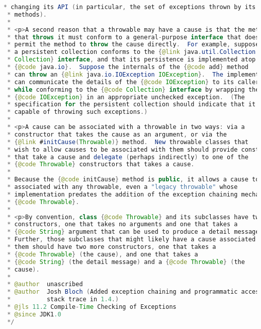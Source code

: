 \begin{lstlisting}[language=java]
 * changing its API (in particular, the set of exceptions thrown by its
 * methods).
 *
 * <p>A second reason that a throwable may have a cause is that the method
 * that throws it must conform to a general-purpose interface that does not
 * permit the method to throw the cause directly.  For example, suppose
 * a persistent collection conforms to the {@link java.util.Collection
 * Collection} interface, and that its persistence is implemented atop
 * {@code java.io}.  Suppose the internals of the {@code add} method
 * can throw an {@link java.io.IOException IOException}.  The implementation
 * can communicate the details of the {@code IOException} to its caller
 * while conforming to the {@code Collection} interface by wrapping the
 * {@code IOException} in an appropriate unchecked exception.  (The
 * specification for the persistent collection should indicate that it is
 * capable of throwing such exceptions.)
 *
 * <p>A cause can be associated with a throwable in two ways: via a
 * constructor that takes the cause as an argument, or via the
 * {@link #initCause(Throwable)} method.  New throwable classes that
 * wish to allow causes to be associated with them should provide constructors
 * that take a cause and delegate (perhaps indirectly) to one of the
 * {@code Throwable} constructors that takes a cause.
 *
 * Because the {@code initCause} method is public, it allows a cause to be
 * associated with any throwable, even a "legacy throwable" whose
 * implementation predates the addition of the exception chaining mechanism to
 * {@code Throwable}.
 *
 * <p>By convention, class {@code Throwable} and its subclasses have two
 * constructors, one that takes no arguments and one that takes a
 * {@code String} argument that can be used to produce a detail message.
 * Further, those subclasses that might likely have a cause associated with
 * them should have two more constructors, one that takes a
 * {@code Throwable} (the cause), and one that takes a
 * {@code String} (the detail message) and a {@code Throwable} (the
 * cause).
 *
 * @author  unascribed
 * @author  Josh Bloch (Added exception chaining and programmatic access to
 *          stack trace in 1.4.)
 * @jls 11.2 Compile-Time Checking of Exceptions
 * @since JDK1.0
 */

\end{lstlisting}
